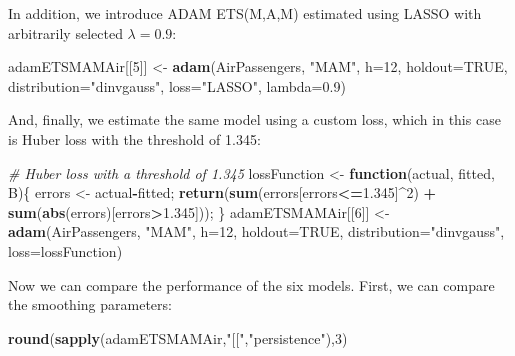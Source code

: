 \documentclass[]{book}
\newenvironment{Shaded}{\begin{snugshade}}{\end{snugshade}}
\newcommand{\CommentTok}[1]{\textcolor[rgb]{0.56,0.35,0.01}{\textit{#1}}}
\newcommand{\ControlFlowTok}[1]{\textcolor[rgb]{0.13,0.29,0.53}{\textbf{#1}}}
\newcommand{\DataTypeTok}[1]{\textcolor[rgb]{0.13,0.29,0.53}{#1}}
\newcommand{\DecValTok}[1]{\textcolor[rgb]{0.00,0.00,0.81}{#1}}
\newcommand{\FloatTok}[1]{\textcolor[rgb]{0.00,0.00,0.81}{#1}}
\newcommand{\KeywordTok}[1]{\textcolor[rgb]{0.13,0.29,0.53}{\textbf{#1}}}
\newcommand{\NormalTok}[1]{#1}
\newcommand{\OperatorTok}[1]{\textcolor[rgb]{0.81,0.36,0.00}{\textbf{#1}}}
\newcommand{\OtherTok}[1]{\textcolor[rgb]{0.56,0.35,0.01}{#1}}
\newcommand{\StringTok}[1]{\textcolor[rgb]{0.31,0.60,0.02}{#1}}
\theoremstyle{definition}
\theoremstyle{definition}
\theoremstyle{definition}
\theoremstyle{definition}
\theoremstyle{remark}
\begin{document}
In addition, we introduce ADAM ETS(M,A,M) estimated using LASSO with arbitrarily selected \(\lambda=0.9\):

\begin{Shaded}
\begin{Highlighting}[]
\NormalTok{adamETSMAMAir[[}\DecValTok{5}\NormalTok{]] <-}\StringTok{ }\KeywordTok{adam}\NormalTok{(AirPassengers, }\StringTok{"MAM"}\NormalTok{, }\DataTypeTok{h=}\DecValTok{12}\NormalTok{, }\DataTypeTok{holdout=}\OtherTok{TRUE}\NormalTok{,}
                           \DataTypeTok{distribution=}\StringTok{"dinvgauss"}\NormalTok{,}
                           \DataTypeTok{loss=}\StringTok{"LASSO"}\NormalTok{, }\DataTypeTok{lambda=}\FloatTok{0.9}\NormalTok{)}
\end{Highlighting}
\end{Shaded}

And, finally, we estimate the same model using a custom loss, which in this case is Huber loss \citep{Huber1992} with the threshold of 1.345:

\begin{Shaded}
\begin{Highlighting}[]
\CommentTok{# Huber loss with a threshold of 1.345}
\NormalTok{lossFunction <-}\StringTok{ }\ControlFlowTok{function}\NormalTok{(actual, fitted, B)\{}
\NormalTok{    errors <-}\StringTok{ }\NormalTok{actual}\OperatorTok{-}\NormalTok{fitted;}
    \KeywordTok{return}\NormalTok{(}\KeywordTok{sum}\NormalTok{(errors[errors}\OperatorTok{<=}\FloatTok{1.345}\NormalTok{]}\OperatorTok{^}\DecValTok{2}\NormalTok{) }\OperatorTok{+}
\StringTok{               }\KeywordTok{sum}\NormalTok{(}\KeywordTok{abs}\NormalTok{(errors)[errors}\OperatorTok{>}\FloatTok{1.345}\NormalTok{]));}
\NormalTok{\}}
\NormalTok{adamETSMAMAir[[}\DecValTok{6}\NormalTok{]] <-}\StringTok{ }\KeywordTok{adam}\NormalTok{(AirPassengers, }\StringTok{"MAM"}\NormalTok{, }\DataTypeTok{h=}\DecValTok{12}\NormalTok{, }\DataTypeTok{holdout=}\OtherTok{TRUE}\NormalTok{,}
                           \DataTypeTok{distribution=}\StringTok{"dinvgauss"}\NormalTok{,}
                           \DataTypeTok{loss=}\NormalTok{lossFunction)}
\end{Highlighting}
\end{Shaded}

Now we can compare the performance of the six models. First, we can compare the smoothing parameters:

\begin{Shaded}
\begin{Highlighting}[]
\KeywordTok{round}\NormalTok{(}\KeywordTok{sapply}\NormalTok{(adamETSMAMAir,}\StringTok{"[["}\NormalTok{,}\StringTok{"persistence"}\NormalTok{),}\DecValTok{3}\NormalTok{)}
\end{Highlighting}
\end{Shaded}
\end{document}
